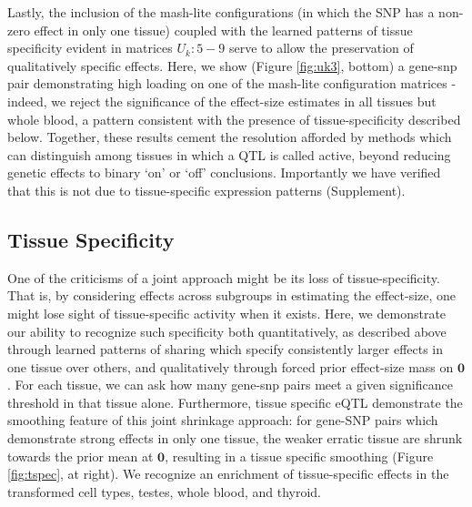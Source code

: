 Lastly, the inclusion of the mash-lite configurations (in which the SNP has a non-zero effect in only one tissue) coupled with the learned patterns of tissue specificity evident in matrices $U_{k}: 5-9$ serve to allow the preservation of qualitatively specific effects. Here, we show (Figure \ref{fig:uk3}, bottom) a gene-snp pair demonstrating high loading on one of the mash-lite configuration matrices - indeed, we reject the significance of the effect-size estimates in all tissues but whole blood,  a pattern consistent with the presence of tissue-specificity described below. Together, these results cement the resolution afforded by methods which can distinguish among tissues in which a QTL is called active, beyond reducing genetic effects to binary `on' or `off' conclusions. Importantly we have verified that this is not due to tissue-specific expression patterns (Supplement). %


\subsection{Tissue Specificity}\label{ssec:tissuespec}

One of the criticisms of a joint approach might be its loss of tissue-specificity. That is, by considering effects across subgroups in estimating the effect-size, one might lose sight of tissue-specific activity when it exists. Here, we demonstrate our ability to recognize such specificity both quantitatively, as described above through learned patterns of sharing which specify consistently larger effects in one tissue over others, and qualitatively through forced prior effect-size mass on $\bm{0}$.  For each tissue, we can ask how many gene-snp pairs meet a given significance threshold in that tissue alone. Furthermore, tissue specific eQTL demonstrate the smoothing feature of this joint shrinkage approach: for gene-SNP pairs which demonstrate strong effects in only one tissue, the weaker erratic tissue are shrunk towards the prior mean at $\bm{0}$, resulting in a tissue specific smoothing (Figure \ref{fig:tspec}, at right). We recognize an enrichment of tissue-specific effects in the transformed cell types, testes, whole blood, and thyroid. 


